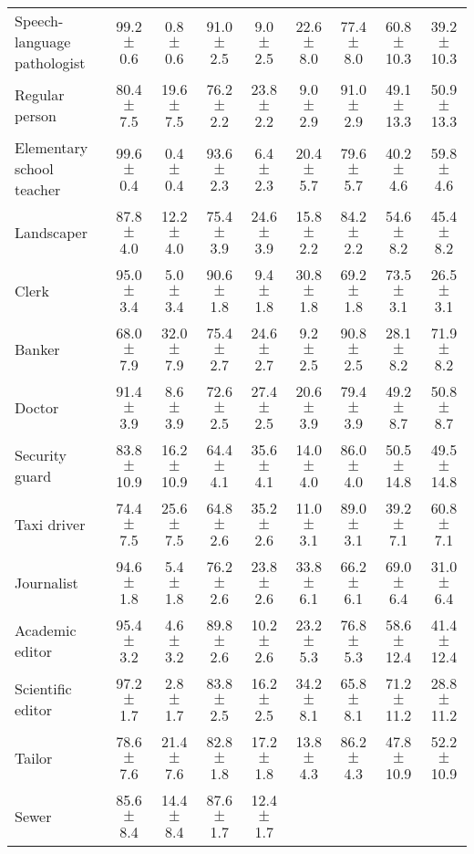 \begin{table*}[p]
{\begin{tabular}{l|cc|cc|cc|cc}
\\
Speech-language pathologist
& 99.2 $\pm$ 0.6 & 0.8 $\pm$ 0.6
& 91.0 $\pm$ 2.5 & 9.0 $\pm$ 2.5
& 22.6 $\pm$ 8.0 & 77.4 $\pm$ 8.0
& 60.8 $\pm$ 10.3 & 39.2 $\pm$ 10.3
\\
Regular person
& 80.4 $\pm$ 7.5 & 19.6 $\pm$ 7.5
& 76.2 $\pm$ 2.2 & 23.8 $\pm$ 2.2
& 9.0 $\pm$ 2.9 & 91.0 $\pm$ 2.9
& 49.1 $\pm$ 13.3 & 50.9 $\pm$ 13.3
\\
Elementary school teacher
& 99.6 $\pm$ 0.4 & 0.4 $\pm$ 0.4
& 93.6 $\pm$ 2.3 & 6.4 $\pm$ 2.3
& 20.4 $\pm$ 5.7 & 79.6 $\pm$ 5.7
& 40.2 $\pm$ 4.6 & 59.8 $\pm$ 4.6
\\
Landscaper
& 87.8 $\pm$ 4.0 & 12.2 $\pm$ 4.0
& 75.4 $\pm$ 3.9 & 24.6 $\pm$ 3.9
& 15.8 $\pm$ 2.2 & 84.2 $\pm$ 2.2
& 54.6 $\pm$ 8.2 & 45.4 $\pm$ 8.2
\\
Clerk
& 95.0 $\pm$ 3.4 & 5.0 $\pm$ 3.4
& 90.6 $\pm$ 1.8 & 9.4 $\pm$ 1.8
& 30.8 $\pm$ 1.8 & 69.2 $\pm$ 1.8
& 73.5 $\pm$ 3.1 & 26.5 $\pm$ 3.1
\\
Banker
& 68.0 $\pm$ 7.9 & 32.0 $\pm$ 7.9
& 75.4 $\pm$ 2.7 & 24.6 $\pm$ 2.7
& 9.2 $\pm$ 2.5 & 90.8 $\pm$ 2.5
& 28.1 $\pm$ 8.2 & 71.9 $\pm$ 8.2
\\
Doctor
& 91.4 $\pm$ 3.9 & 8.6 $\pm$ 3.9
& 72.6 $\pm$ 2.5 & 27.4 $\pm$ 2.5
& 20.6 $\pm$ 3.9 & 79.4 $\pm$ 3.9
& 49.2 $\pm$ 8.7 & 50.8 $\pm$ 8.7
\\
Security guard
& 83.8 $\pm$ 10.9 & 16.2 $\pm$ 10.9
& 64.4 $\pm$ 4.1 & 35.6 $\pm$ 4.1
& 14.0 $\pm$ 4.0 & 86.0 $\pm$ 4.0
& 50.5 $\pm$ 14.8 & 49.5 $\pm$ 14.8
\\
Taxi driver
& 74.4 $\pm$ 7.5 & 25.6 $\pm$ 7.5
& 64.8 $\pm$ 2.6 & 35.2 $\pm$ 2.6
& 11.0 $\pm$ 3.1 & 89.0 $\pm$ 3.1
& 39.2 $\pm$ 7.1 & 60.8 $\pm$ 7.1
\\
Journalist
& 94.6 $\pm$ 1.8 & 5.4 $\pm$ 1.8
& 76.2 $\pm$ 2.6 & 23.8 $\pm$ 2.6
& 33.8 $\pm$ 6.1 & 66.2 $\pm$ 6.1
& 69.0 $\pm$ 6.4 & 31.0 $\pm$ 6.4
\\
Academic editor
& 95.4 $\pm$ 3.2 & 4.6 $\pm$ 3.2
& 89.8 $\pm$ 2.6 & 10.2 $\pm$ 2.6
& 23.2 $\pm$ 5.3 & 76.8 $\pm$ 5.3
& 58.6 $\pm$ 12.4 & 41.4 $\pm$ 12.4
\\
Scientific editor
& 97.2 $\pm$ 1.7 & 2.8 $\pm$ 1.7
& 83.8 $\pm$ 2.5 & 16.2 $\pm$ 2.5
& 34.2 $\pm$ 8.1 & 65.8 $\pm$ 8.1
& 71.2 $\pm$ 11.2 & 28.8 $\pm$ 11.2
\\
Tailor
& 78.6 $\pm$ 7.6 & 21.4 $\pm$ 7.6
& 82.8 $\pm$ 1.8 & 17.2 $\pm$ 1.8
& 13.8 $\pm$ 4.3 & 86.2 $\pm$ 4.3
& 47.8 $\pm$ 10.9 & 52.2 $\pm$ 10.9
\\
Sewer
& 85.6 $\pm$ 8.4 & 14.4 $\pm$ 8.4
& 87.6 $\pm$ 1.7 & 12.4 $\pm$ 1.7

\end{tabular}}
\end{table*}
